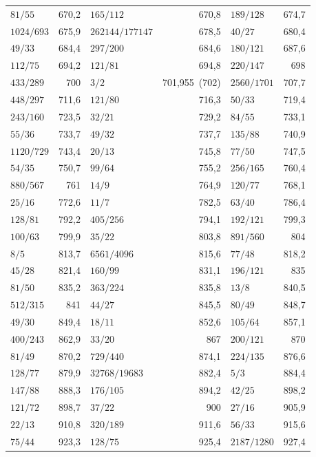{\begin{longtable}{l r @{\qquad} l r @{\qquad} l r}
$81/55$ & 670{,}2 & $165/112$ & 670{,}8 & $189/128$ & 674{,}7 \\
$1024/693$ & 675{,}9 & $262144/177147$ & 678{,}5 & $40/27$ & 680{,}4 \\
$49/33$ & 684{,}4 & $297/200$ & 684{,}6 & $180/121$ & 687{,}6 \\
$112/75$ & 694{,}2 & $121/81$ & 694{,}8 & $220/147$ & 698 \\
$433/289$ & 700 & $3/2$ & 701{,}955~(702) & $2560/1701$ & 707{,}7 \\
$448/297$ & 711{,}6 & $121/80$ & 716{,}3 & $50/33$ & 719{,}4 \\
$243/160$ & 723{,}5 & $32/21$ & 729{,}2 & $84/55$ & 733{,}1 \\
$55/36$ & 733{,}7 & $49/32$ & 737{,}7 & $135/88$ & 740{,}9 \\
$1120/729$ & 743{,}4 & $20/13$ & 745{,}8 & $77/50$ & 747{,}5 \\
$54/35$ & 750{,}7 & $99/64$ & 755{,}2 & $256/165$ & 760{,}4 \\
$880/567$ & 761 & $14/9$ & 764{,}9 & $120/77$ & 768{,}1 \\
$25/16$ & 772{,}6 & $11/7$ & 782{,}5 & $63/40$ & 786{,}4 \\
$128/81$ & 792{,}2 & $405/256$ & 794{,}1 & $192/121$ & 799{,}3 \\
$100/63$ & 799{,}9 & $35/22$ & 803{,}8 & $891/560$ & 804 \\
$8/5$ & 813{,}7 & $6561/4096$ & 815{,}6 & $77/48$ & 818{,}2 \\
$45/28$ & 821{,}4 & $160/99$ & 831{,}1 & $196/121$ & 835 \\
$81/50$ & 835{,}2 & $363/224$ & 835{,}8 & $13/8$ & 840{,}5 \\
$512/315$ & 841 & $44/27$ & 845{,}5 & $80/49$ & 848{,}7 \\
$49/30$ & 849{,}4 & $18/11$ & 852{,}6 & $105/64$ & 857{,}1 \\
$400/243$ & 862{,}9 & $33/20$ & 867 & $200/121$ & 870 \\
$81/49$ & 870{,}2 & $729/440$ & 874{,}1 & $224/135$ & 876{,}6 \\
$128/77$ & 879{,}9 & $32768/19683$ & 882{,}4 & $5/3$ & 884{,}4 \\
$147/88$ & 888{,}3 & $176/105$ & 894{,}2 & $42/25$ & 898{,}2 \\
$121/72$ & 898{,}7 & $37/22$ & 900 & $27/16$ & 905{,}9 \\
$22/13$ & 910{,}8 & $320/189$ & 911{,}6 & $56/33$ & 915{,}6 \\
$75/44$ & 923{,}3 & $128/75$ & 925{,}4 & $2187/1280$ & 927{,}4 \\

\end{longtable}}
